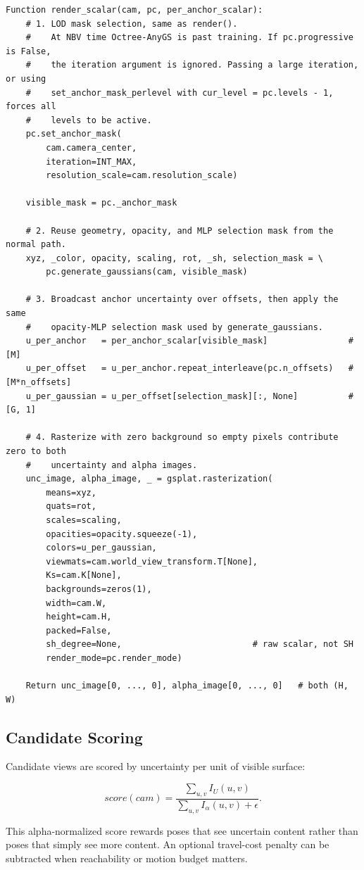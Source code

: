 \documentclass[11pt]{article}
\begin{document}
\begin{lstlisting}
Function render_scalar(cam, pc, per_anchor_scalar):
    # 1. LOD mask selection, same as render().
    #    At NBV time Octree-AnyGS is past training. If pc.progressive is False,
    #    the iteration argument is ignored. Passing a large iteration, or using
    #    set_anchor_mask_perlevel with cur_level = pc.levels - 1, forces all
    #    levels to be active.
    pc.set_anchor_mask(
        cam.camera_center,
        iteration=INT_MAX,
        resolution_scale=cam.resolution_scale)

    visible_mask = pc._anchor_mask

    # 2. Reuse geometry, opacity, and MLP selection mask from the normal path.
    xyz, _color, opacity, scaling, rot, _sh, selection_mask = \
        pc.generate_gaussians(cam, visible_mask)

    # 3. Broadcast anchor uncertainty over offsets, then apply the same
    #    opacity-MLP selection mask used by generate_gaussians.
    u_per_anchor   = per_anchor_scalar[visible_mask]                # [M]
    u_per_offset   = u_per_anchor.repeat_interleave(pc.n_offsets)   # [M*n_offsets]
    u_per_gaussian = u_per_offset[selection_mask][:, None]          # [G, 1]

    # 4. Rasterize with zero background so empty pixels contribute zero to both
    #    uncertainty and alpha images.
    unc_image, alpha_image, _ = gsplat.rasterization(
        means=xyz,
        quats=rot,
        scales=scaling,
        opacities=opacity.squeeze(-1),
        colors=u_per_gaussian,
        viewmats=cam.world_view_transform.T[None],
        Ks=cam.K[None],
        backgrounds=zeros(1),
        width=cam.W,
        height=cam.H,
        packed=False,
        sh_degree=None,                          # raw scalar, not SH
        render_mode=pc.render_mode)

    Return unc_image[0, ..., 0], alpha_image[0, ..., 0]   # both (H, W)
\end{lstlisting}

\subsection{Candidate Scoring}

Candidate views are scored by uncertainty per unit of visible surface:

\[
  score(cam)
  =
  \frac{\sum_{u,v} I_U(u,v)}
       {\sum_{u,v} I_\alpha(u,v) + \epsilon}.
\]

This alpha-normalized score rewards poses that see uncertain content rather
than poses that simply see more content. An optional travel-cost penalty can
be subtracted when reachability or motion budget matters.
\end{document}
